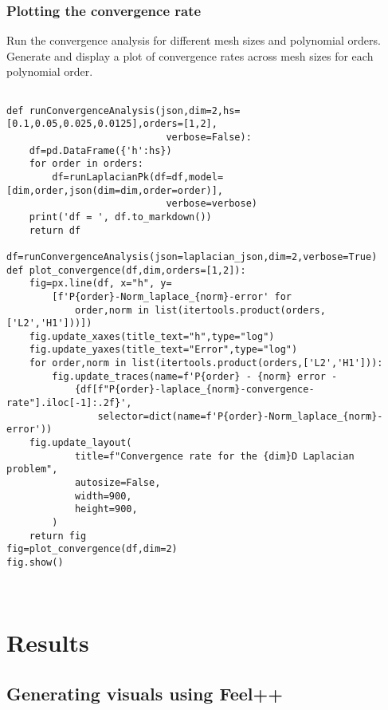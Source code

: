 \documentclass[12pt]{article}
\begin{document}
\subsubsection{Plotting the convergence rate}
Run the convergence analysis for different mesh sizes and polynomial orders. Generate and display a plot of convergence rates across mesh sizes for each polynomial order.

\begin{lstlisting}[language=Python3,caption={},frame=single, backgroundcolor=\color{gray!10}, basicstyle=\footnotesize,rulecolor=\color{blue}, framexleftmargin=3pt, commentstyle=\color{mygreen}, keywordstyle=\color{blue}]

def runConvergenceAnalysis(json,dim=2,hs=[0.1,0.05,0.025,0.0125],orders=[1,2],
                            verbose=False):
    df=pd.DataFrame({'h':hs})
    for order in orders:
        df=runLaplacianPk(df=df,model=[dim,order,json(dim=dim,order=order)],
                            verbose=verbose)
    print('df = ', df.to_markdown())
    return df

df=runConvergenceAnalysis(json=laplacian_json,dim=2,verbose=True)
def plot_convergence(df,dim,orders=[1,2]):
    fig=px.line(df, x="h", y=
        [f'P{order}-Norm_laplace_{norm}-error' for 
            order,norm in list(itertools.product(orders,['L2','H1']))])
    fig.update_xaxes(title_text="h",type="log")
    fig.update_yaxes(title_text="Error",type="log")
    for order,norm in list(itertools.product(orders,['L2','H1'])):
        fig.update_traces(name=f'P{order} - {norm} error - 
            {df[f"P{order}-laplace_{norm}-convergence-rate"].iloc[-1]:.2f}', 
                selector=dict(name=f'P{order}-Norm_laplace_{norm}-error'))
    fig.update_layout(
            title=f"Convergence rate for the {dim}D Laplacian problem",
            autosize=False,
            width=900,
            height=900,
        )
    return fig
fig=plot_convergence(df,dim=2)
fig.show()



\end{lstlisting}

\newpage

\section{Results}
\subsection{Generating visuals using Feel++}
\end{document}
